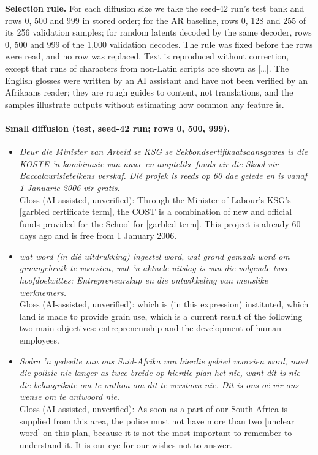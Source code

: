 \documentclass[11pt,a4paper]{article}
\begin{document}
\textbf{Selection rule.} For each diffusion size we take the seed-42 run's test bank and rows 0, 500 and 999 in stored order; for the AR baseline, rows 0, 128 and 255 of its 256 validation samples; for random latents decoded by the same decoder, rows 0, 500 and 999 of the 1,000 validation decodes. The rule was fixed before the rows were read, and no row was replaced. Text is reproduced without correction, except that runs of characters from non-Latin scripts are shown as [\ldots]. The English glosses were written by an AI assistant and have not been verified by an Afrikaans reader; they are rough guides to content, not translations, and the samples illustrate outputs without estimating how common any feature is.

\paragraph{Small diffusion (test, seed-42 run; rows 0, 500, 999).}
\begin{itemize}\small
\item[0] \emph{Deur die Minister van Arbeid se KSG se Sekbondsertifikaatsaansgawes is die KOSTE 'n kombinasie van nuwe en amptelike fonds vir die Skool vir Baccalaurisieteikens verskaf. Dié projek is reeds op 60 dae gelede en is vanaf 1 Januarie 2006 vir gratis.}\\
Gloss (AI-assisted, unverified): Through the Minister of Labour's KSG's [garbled certificate term], the COST is a combination of new and official funds provided for the School for [garbled term]. This project is already 60 days ago and is free from 1 January 2006.
\item[500] \emph{wat word (in dié uitdrukking) ingestel word, wat grond gemaak word om graangebruik te voorsien, wat 'n aktuele uitslag is van die volgende twee hoofdoelwittes: Entrepreneurskap en die ontwikkeling van menslike werknemers.}\\
Gloss (AI-assisted, unverified): which is (in this expression) instituted, which land is made to provide grain use, which is a current result of the following two main objectives: entrepreneurship and the development of human employees.
\item[999] \emph{Sodra 'n gedeelte van ons Suid-Afrika van hierdie gebied voorsien word, moet die polisie nie langer as twee breide op hierdie plan het nie, want dit is nie die belangrikste om te onthou om dit te verstaan nie. Dit is ons oë vir ons wense om te antwoord nie.}\\
Gloss (AI-assisted, unverified): As soon as a part of our South Africa is supplied from this area, the police must not have more than two [unclear word] on this plan, because it is not the most important to remember to understand it. It is our eye for our wishes not to answer.
\end{itemize}
\end{document}
